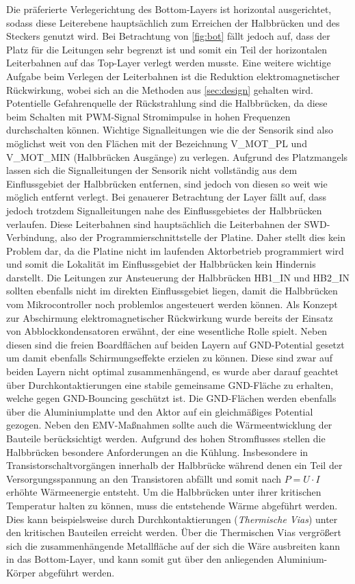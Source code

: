 Die präferierte Verlegerichtung des Bottom-Layers ist horizontal ausgerichtet, sodass diese Leiterebene hauptsächlich zum Erreichen der Halbbrücken und des Steckers genutzt wird. Bei Betrachtung von \autoref{fig:bot} fällt jedoch auf, dass der Platz für die Leitungen sehr begrenzt ist und somit ein Teil der horizontalen Leiterbahnen auf das Top-Layer verlegt werden musste. Eine weitere wichtige Aufgabe beim Verlegen der Leiterbahnen ist die Reduktion elektromagnetischer Rückwirkung, wobei sich an die Methoden aus \autoref{sec:design} gehalten wird. Potentielle Gefahrenquelle der Rückstrahlung sind die Halbbrücken, da diese beim Schalten mit PWM-Signal Stromimpulse in hohen Frequenzen durchschalten können. Wichtige Signalleitungen wie die der Sensorik sind also möglichst weit von den Flächen mit der Bezeichnung V\_MOT\_PL und V\_MOT\_MIN (Halbbrücken Ausgänge) zu verlegen. Aufgrund des Platzmangels lassen sich die Signalleitungen der Sensorik nicht vollständig aus dem Einflussgebiet der Halbbrücken entfernen, sind jedoch von diesen so weit wie möglich entfernt verlegt. Bei genauerer Betrachtung der Layer fällt auf, dass jedoch trotzdem Signalleitungen nahe des Einflussgebietes der Halbbrücken verlaufen. Diese Leiterbahnen sind hauptsächlich die Leiterbahnen der SWD-Verbindung, also der Programmierschnittstelle der Platine. Daher stellt dies kein Problem dar, da die Platine nicht im laufenden Aktorbetrieb programmiert wird und somit die Lokalität im Einflussgebiet der Halbbrücken kein Hindernis darstellt. Die Leitungen zur Ansteuerung der Halbbrücken HB1\_IN und HB2\_IN sollten ebenfalls nicht im direkten Einflussgebiet liegen, damit die Halbbrücken vom Mikrocontroller noch problemlos angesteuert werden können. Als Konzept zur Abschirmung elektromagnetischer Rückwirkung wurde bereits der Einsatz von Abblockkondensatoren erwähnt, der eine wesentliche Rolle spielt. Neben diesen sind die freien Boardflächen auf beiden Layern auf GND-Potential gesetzt um damit ebenfalls Schirmungseffekte erzielen zu können. Diese sind zwar auf beiden Layern nicht optimal zusammenhängend, es wurde aber darauf geachtet über Durchkontaktierungen eine stabile gemeinsame GND-Fläche zu erhalten, welche gegen GND-Bouncing geschützt ist. Die GND-Flächen werden ebenfalls über die Aluminiumplatte und den Aktor auf ein gleichmäßiges Potential gezogen. Neben den EMV-Maßnahmen sollte auch die Wärmeentwicklung der Bauteile berücksichtigt werden. Aufgrund des hohen Stromflusses stellen die Halbbrücken besondere Anforderungen an die Kühlung. Insbesondere in Transistorschaltvorgängen innerhalb der Halbbrücke während denen ein Teil der Versorgungsspannung an den Transistoren abfällt und somit nach $P = U\cdot I$ erhöhte Wärmeenergie entsteht. Um die Halbbrücken unter ihrer kritischen Temperatur halten zu können, muss die entstehende Wärme abgeführt werden. Dies kann beispielsweise durch Durchkontaktierungen (\textit{Thermische Vias}) unter den kritischen Bauteilen erreicht werden. Über die Thermischen Vias vergrößert sich die zusammenhängende Metallfläche auf der sich die Wäre ausbreiten kann in das Bottom-Layer, und kann somit gut über den anliegenden Aluminium-Körper abgeführt werden.
